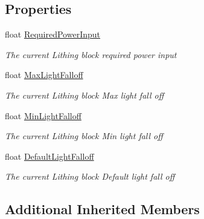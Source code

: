 \subsection*{Properties}
\begin{DoxyCompactItemize}
\item 
float \hyperlink{class_s_e_mod_a_p_i_1_1_a_p_i_1_1_definitions_1_1_cube_blocks_1_1_lighting_block_definition_a1562c4dc2373a848976776a40ecdfb48}{Required\+Power\+Input}
\begin{DoxyCompactList}\small\item\em The current Lithing block required power input \end{DoxyCompactList}\item 
float \hyperlink{class_s_e_mod_a_p_i_1_1_a_p_i_1_1_definitions_1_1_cube_blocks_1_1_lighting_block_definition_a0218f838c84151b4d365b1008fdc0b1b}{Max\+Light\+Falloff}
\begin{DoxyCompactList}\small\item\em The current Lithing block Max light fall off \end{DoxyCompactList}\item 
float \hyperlink{class_s_e_mod_a_p_i_1_1_a_p_i_1_1_definitions_1_1_cube_blocks_1_1_lighting_block_definition_a6e2a26ba946df8f7443938b0f6a9c784}{Min\+Light\+Falloff}
\begin{DoxyCompactList}\small\item\em The current Lithing block Min light fall off \end{DoxyCompactList}\item 
float \hyperlink{class_s_e_mod_a_p_i_1_1_a_p_i_1_1_definitions_1_1_cube_blocks_1_1_lighting_block_definition_a18b1aea485ec363d394eb2b87e95bd36}{Default\+Light\+Falloff}
\begin{DoxyCompactList}\small\item\em The current Lithing block Default light fall off \end{DoxyCompactList}\end{DoxyCompactItemize}
\subsection*{Additional Inherited Members}


